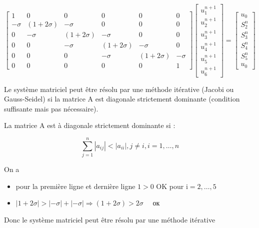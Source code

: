 \documentclass[10pt]{article}
\begin{document}
\[
\left[\begin{array}{cccccc}
1 & 0 & 0 & 0 & 0 & 0 \\
-\sigma & (1+2 \sigma) & -\sigma & 0 & 0 & 0 \\
0 & -\sigma & (1+2 \sigma) & -\sigma & 0 & 0 \\
0 & 0 & -\sigma & (1+2 \sigma) & -\sigma & 0 \\
0 & 0 & 0 & -\sigma & (1+2 \sigma) & -\sigma \\
0 & 0 & 0 & 0 & 0 & 1
\end{array}\right]\left[\begin{array}{c}
u_{1}^{n+1} \\
u_{2}^{n+1} \\
u_{3}^{n+1} \\
u_{4}^{n+1} \\
u_{5}^{n+1} \\
u_{6}^{n+1}
\end{array}\right]=\left[\begin{array}{c}
u_{0} \\
S_{2}^{n} \\
S_{3}^{n} \\
S_{4}^{n} \\
S_{5}^{n} \\
u_{0}
\end{array}\right]
\]

Le système matriciel peut être résolu par une méthode itérative (Jacobi ou Gauss-Seidel) si la matrice A est diagonale strictement dominante (condition suffisante mais pas nécessaire).

La matrice A est à diagonale strictement dominante si :

\[
\sum_{j=1}^{n}\left|a_{i j}\right|<\left|a_{i i}\right|, j \neq i, i=1, \ldots, n
\]

On a

\begin{itemize}
  \item pour la première ligne et dernière ligne \(1>0\) OK pour \(\mathrm{i}=2, \ldots, 5\)
  \item \(|1+2 \sigma|>|-\sigma|+|-\sigma| \Rightarrow(1+2 \sigma)>2 \sigma \quad\) ок
\end{itemize}

Donc le système matriciel peut être résolu par une méthode itérative
\end{document}
